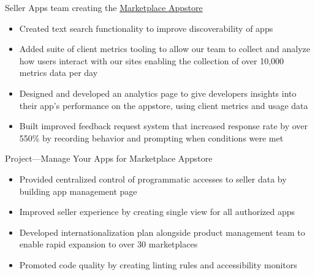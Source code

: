 \documentclass[11pt,letterpaper,ragged2e,withhyper]{altacv}
\newif\ifbubbles
\begin{document}
\begin{paracol}{2}





\switchcolumn


\par Seller Apps team creating the \href{https://sellercentral.amazon.com/apps/store}{\color{accent} Marketplace Appstore}
\begin{itemize}
    \item Created text search functionality to improve discoverability of apps
    \item Added suite of client metrics tooling to allow our team to collect and analyze how users interact with our sites enabling the collection of over 10,000 metrics data per day
    \item Designed and developed an analytics page to give developers insights into their app's performance on the appstore, using client metrics and usage data
    \item Built improved feedback request system that increased response rate by over 550\% by recording behavior and prompting when conditions were met
\end{itemize}

\ifbubbles
    \cvtag{TypeScript}
    \cvtag{Java}
    \cvtag{React}
    \cvtag{Redux}
    \cvtag{AWS}
    \cvtag{Jest}
    \cvtag{Enzyme}
    \cvtag{REST}
\fi

\divider

\par Project—Manage Your Apps for Marketplace Appstore
\begin{itemize}
    \item Provided centralized control of programmatic accesses to seller data by building app management page
    \item Improved seller experience by creating single view for all authorized apps
    \item Developed internationalization plan alongside product management team to enable rapid expansion to over 30 marketplaces
    \item Promoted code quality by creating linting rules and accessibility monitors
\end{itemize}


\end{paracol}
\end{document}
